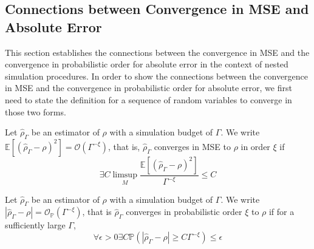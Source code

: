 \subsection{Connections between Convergence in MSE and Absolute Error} \label{sec1:connection-mse-absolute-error}

This section establishes the connections between the convergence in MSE and the convergence in probabilistic order for absolute error in the context of nested simulation procedures.
In order to show the connections between the convergence in MSE and the convergence in probabilistic order for absolute error, we first need to state the definition for a sequence of random variables to converge in those two forms.

\begin{definition}
    Let $\hat{\rho}_{\Gamma}$ be an estimator of $\rho$ with a simulation budget of $\Gamma$. 
    We write $\mathbb{E} \left[ \left(\hat{\rho}_{\Gamma} - \rho\right)^2 \right] = \mathcal{O} \left( \Gamma^{-\xi} \right)$, that is, $\hat{\rho}_{\Gamma}$ converges in MSE to $\rho$ in order $\xi$ if 
    $$
        \exists C \limsup_{M} \frac{\mathbb{E} \left[\left(\hat{\rho}_{\Gamma} - \rho\right)^2 \right]}{\Gamma^{-\xi}} \leq C
    $$
\end{definition}

\begin{definition}
    Let $\hat{\rho}_{\Gamma}$ be an estimator of $\rho$ with a simulation budget of $\Gamma$. 
    We write $|\hat{\rho}_{\Gamma} - \rho| = \mathcal{O}_{\mathbb{P}}(\Gamma^{-\xi})$, that is $\hat{\rho}_{\Gamma}$ converges in probabilistic order $\xi$ to $\rho$ if for a sufficiently large $\Gamma$,
    $$
        \forall \epsilon > 0 \exists C \mathbb{P} \left( \left| \hat{\rho}_{\Gamma} - \rho \right| \geq C \Gamma^{-\xi} \right) \leq \epsilon 
    $$
\end{definition}

